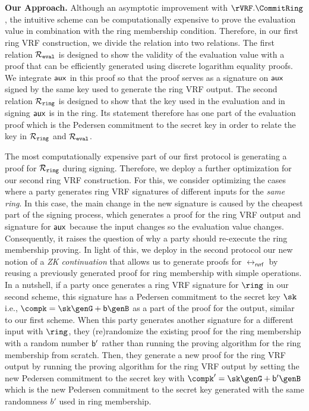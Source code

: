\\\\
\noindent \textbf{Our Approach.} Although an asymptotic improvement with $ \rVRF.\CommitRing $, 
the intuitive scheme can be computationally expensive to prove the evaluation value in combination with the ring membership condition. Therefore, in our first ring VRF construction,  we divide the relation into two relations. The first relation $ \mathcal{R}_{\mathtt{eval}} $ is designed  to show the validity of the evaluation value with a proof that can be efficiently generated using discrete logarithm equality proofs.  We integrate $ \mathsf{aux} $ in this proof so that the proof serves as a signature on $ \mathsf{aux} $ signed by the same key used to generate the ring VRF output.   The second relation $ \mathcal{R}_{\mathtt{ring}} $ is designed to show that the key used in the evaluation and in signing $ \mathsf{aux} $ is in the ring. Its statement therefore has one part of the evaluation proof which is the Pedersen commitment to the secret key in order to relate the key in $ \mathcal{R}_{\mathtt{ring}} $ and $ \mathcal{R}_{\mathtt{eval}} $.

The most computationally expensive part of our first protocol is generating a proof for $ \mathcal{R}_{\mathtt{ring}} $ during signing. Therefore, we deploy a further optimization for our second ring VRF construction. For this,  we consider optimizing the cases where a party generates ring VRF signatures of different inputs for the \emph{same ring}.  In this case, the main change in the new signature is caused by the cheapest   part of the signing process, which generates a proof for the ring VRF output and signature for $ \mathsf{aux} $  because the input changes so the evaluation value changes.  Consequently, it raises the question of why a party should re-execute the ring membership proving.  In light of this, we deploy in the second protocol our  new notion of a \emph{ZK continuation} that allows us to generate proofs for $ \rel_{\mathsf{rvrf}} $ by reusing a previously generated proof for ring membership with simple operations. 
In a nutshell, if a party once generates a ring VRF signature for $ \ring $ in our second scheme, this signature has a  Pedersen commitment to the secret key $ \sk $ i.e., $ \compk = \sk \genG + \openpk \genB $ as a part of the proof for the output, similar to our first scheme.  When this party generates another signature for a different input  with $ \ring $, they (re)randomize the  existing proof for the ring membership with a random number $ \mathsf{b}' $ rather than  running the proving algorithm for the ring membership from scratch. Then, they generate a new proof for the ring VRF output by running the proving algorithm for the ring VRF output by setting the new Pedersen commitment to the secret key with $ \compk' = \sk \genG + \openpk'\genB $ which is the new  Pedersen commitment to the secret key generated  with the same randomness $ b' $ used in ring membership.



